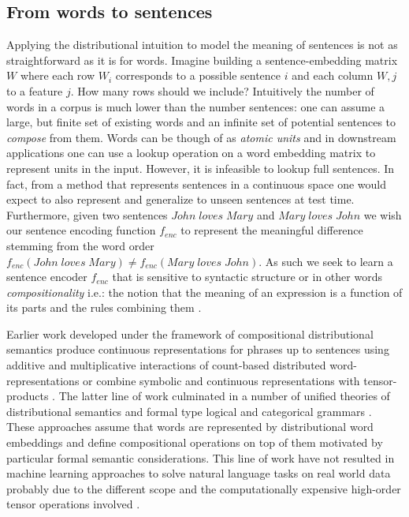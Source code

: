 \subsection{From words to sentences}
\label{sec:sentences}
Applying the distributional intuition to model the meaning of sentences is not as straightforward
as it is for words.
Imagine building a sentence-embedding matrix $W$ where each row $W_i$ corresponds to
a possible sentence $i$ and each column $W,j$ to a feature $j$.
How many rows should we include? Intuitively the number of words in a corpus is much
lower than the number sentences: one can assume a large, but finite set
of existing words and an infinite set of
potential sentences to \emph{compose} from them.
Words can be though of as \emph{atomic units} and
in downstream applications one can use a lookup operation on a word embedding matrix
to represent units in the input. However, it is infeasible to lookup full sentences.
In fact, from a method that represents sentences in a continuous space one would expect
to also represent and generalize to unseen sentences at test time.
Furthermore, given two sentences $\mathit{John \; loves \; Mary}$ and
$\mathit{Mary \; loves \; John}$ we wish our sentence encoding function
$f_{enc}$ to represent the meaningful difference stemming from the word order
$f_{enc}(\mathit{John \; loves \; Mary}) \neq f_{enc}(\mathit{Mary \; loves \; John})$.
As such we seek to learn a sentence encoder $f_{enc}$ that is sensitive to
syntactic structure or in other words \emph{compositionality} i.e.:
the notion that the meaning of an expression is
a function of its parts and the rules combining them \cite{montague1970english}.

Earlier work developed under the framework of compositional distributional semantics produce
continuous representations for phrases up to sentences using additive and multiplicative interactions
of count-based distributed word-representations \cite{mitchell2008vector} or combine symbolic and
continuous representations with tensor-products \cite{clark2007combining}.
The latter line of work culminated in a number of unified theories of
distributional semantics and formal type logical and categorical grammars
\cite{coecke2010mathematical,clarke2012context,baroni2014frege}.
These approaches assume that words are represented by distributional word embeddings
and define compositional operations on top of them motivated by particular formal
semantic considerations. This line of work have not resulted in
machine learning approaches to solve natural language tasks
on real world data probably due to the different scope and
the computationally expensive high-order
tensor operations involved \cite{bowman2016modeling}.

